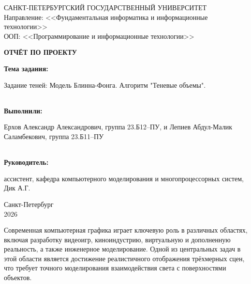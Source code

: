 \documentclass[a4paper, 12pt]{article}
\begin{document}
\begin{titlepage}
    \begin{center}
        САНКТ-ПЕТЕРБУРГСКИЙ ГОСУДАРСТВЕННЫЙ УНИВЕРСИТЕТ \\
        Направление: <<Фундаментальная информатика и информационные технологии>> \\ 
        ООП: <<Программирование и информационные технологии>> 

        \vspace{6cm}
        {\bfseries ОТЧЁТ ПО ПРОЕКТУ} 
        \vspace{\baselineskip}
        \begin{flushleft}
            {\bfseries Тема задания:} 
                \begin{minipage}[t]{0.8\textwidth}
                    Задание теней: Модель Блинна-Фонга. Алгоритм "Теневые объемы".
                \end{minipage}\\
            \vspace{\baselineskip}
            {\bfseries Выполнили:}
            	\begin{minipage}[t]{0.8\textwidth}
            		Ерхов Александр Александрович, группа 23.Б12--ПУ, и Лепиев Абдул-Малик Саламбекович, группа 23.Б11--ПУ
            	\end{minipage}\\
            \vspace{\baselineskip}
            {\bfseries Руководитель:} 
                \begin{minipage}[t]{0.8\textwidth}
                    ассистент, кафедра компьютерного моделирования и многопроцессорных систем,\\  Дик А.\:Г.
                \end{minipage}
        \end{flushleft}

        \vspace{\fill}
        Санкт-Петербург \\
        2026
    \end{center}
\end{titlepage}
\addtocounter{page}{1}

\newpage
\tableofcontents

\newpage
{}

Современная компьютерная графика играет ключевую роль в различных областях, включая разработку видеоигр, киноиндустрию, виртуальную и дополненную реальность, а также инженерное моделирование. Одной из центральных задач в этой области является достижение реалистичного отображения трёхмерных сцен, что требует точного моделирования взаимодействия света с поверхностями объектов.
\end{document}
